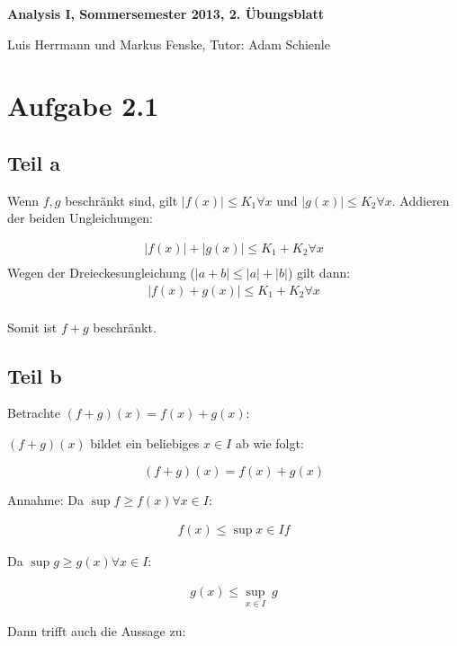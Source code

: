 \documentclass[a4paper,german,12pt,smallheadings]{scrartcl}
\begin{document}
\begin{center}
\bfseries %
\sffamily %
\vspace{-40pt}
Analysis I, Sommersemester 2013, 2. Übungsblatt

Luis Herrmann und Markus Fenske, Tutor: Adam Schienle
\vspace{-10pt}
\end{center}

\section*{Aufgabe 2.1}
\subsection*{Teil a}
Wenn $f, g$ beschränkt sind, gilt $|f(x)| \le K_1 \forall x$ und $|g(x)| \le K_2
\forall x$. Addieren der beiden Ungleichungen:

\begin{align*}
  |f(x)| + |g(x)| \le K_1 + K_2 \forall x \\
\end{align*}
Wegen der Dreieckesungleichung ($|a + b| \le |a| + |b|$) gilt dann:
\begin{align*}
  |f(x) + g(x)| \le K_1 + K_2 \forall x \\
\end{align*}

Somit ist $f + g$ beschränkt.
\subsection*{Teil b}
Betrachte $(f+g)(x) = f(x)+g(x)$:

$(f+g)(x)$ bildet ein beliebiges $x \in I$ ab wie folgt:

\begin{equation*}
  (f+g)(x) = f(x) + g(x)
\end{equation*}

Annahme: Da $\sup f \ge f(x) \forall x \in I$:

\begin{align*}
  f(x) \le \sup{x \in I} f
\end{align*}

Da $\sup g \ge g(x) \forall x \in I$:

\begin{align*}
  g(x) \le \sup_{x \in I}\ g
\end{align*}

Dann trifft auch die Aussage zu:
\end{document}
